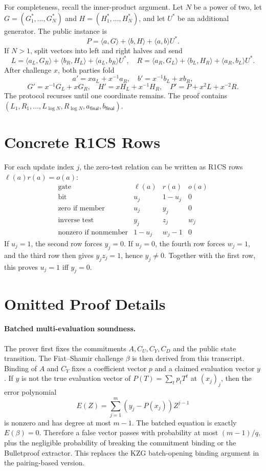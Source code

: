 \documentclass[runningheads]{llncs}
\newcommand{\inner}[2]{\langle #1,#2\rangle}
\begin{document}
For completeness, recall the inner-product argument.  Let \(N\) be a power of two, let \(G=(G_1^*,\ldots,G_N^*)\) and \(H=(H_1^*,\ldots,H_N^*)\), and let \(U^*\) be an additional generator.  The public instance is
\[
        P=\inner{a}{G}+\inner{b}{H}+\inner{a}{b}U^*.
\]
If \(N>1\), split vectors into left and right halves and send
\[
 L=\inner{a_L}{G_R}+\inner{b_R}{H_L}+\inner{a_L}{b_R}U^*,
\quad
 R=\inner{a_R}{G_L}+\inner{b_L}{H_R}+\inner{a_R}{b_L}U^*.
\]
After challenge \(x\), both parties fold
\[
 a'=xa_L+x^{-1}a_R,
 \quad b'=x^{-1}b_L+xb_R,
\]
\[
 G'=x^{-1}G_L+xG_R,
 \quad H'=xH_L+x^{-1}H_R,
 \quad P'=P+x^2L+x^{-2}R.
\]
The protocol recurses until one coordinate remains.  The proof contains \((L_1,R_1,\ldots,L_{\log N},R_{\log N},a_{\mathsf{final}},b_{\mathsf{final}})\).

\section{Concrete R1CS Rows}\label{app:r1cs}

For each update index \(j\), the zero-test relation can be written as R1CS rows \(\ell(a)r(a)=o(a)\):
\[
\begin{array}{c|c|c|c}
\text{gate} & \ell(a) & r(a) & o(a) \\
\hline
\text{bit} & u_j & 1-u_j & 0 \\
\text{zero if member} & u_j & y_j & 0 \\
\text{inverse test} & y_j & z_j & w_j \\
\text{nonzero if nonmember} & 1-u_j & w_j-1 & 0
\end{array}
\]
If \(u_j=1\), the second row forces \(y_j=0\).  If \(u_j=0\), the fourth row forces \(w_j=1\), and the third row then gives \(y_jz_j=1\), hence \(y_j\ne 0\).  Together with the first row, this proves \(u_j=1\) iff \(y_j=0\).

\section{Omitted Proof Details}\label{app:proofs}

\paragraph{Batched multi-evaluation soundness.}
The prover first fixes the commitments \(A,C_U,C_Y,C_D\) and the public state transition.  The Fiat--Shamir challenge \(\beta\) is then derived from this transcript.  Binding of \(A\) and \(C_Y\) fixes a coefficient vector \(p\) and a claimed evaluation vector \(y\).  If \(y\) is not the true evaluation vector of \(P(T)=\sum_tp_tT^t\) at \((x_j)_j\), then the error polynomial
\[
        E(Z)=\sum_{j=1}^m (y_j-P(x_j))Z^{j-1}
\]
is nonzero and has degree at most \(m-1\).  The batched equation is exactly \(E(\beta)=0\).  Therefore a false vector passes with probability at most \((m-1)/q\), plus the negligible probability of breaking the commitment binding or the Bulletproof extractor.  This replaces the KZG batch-opening binding argument in the pairing-based version.
\end{document}
